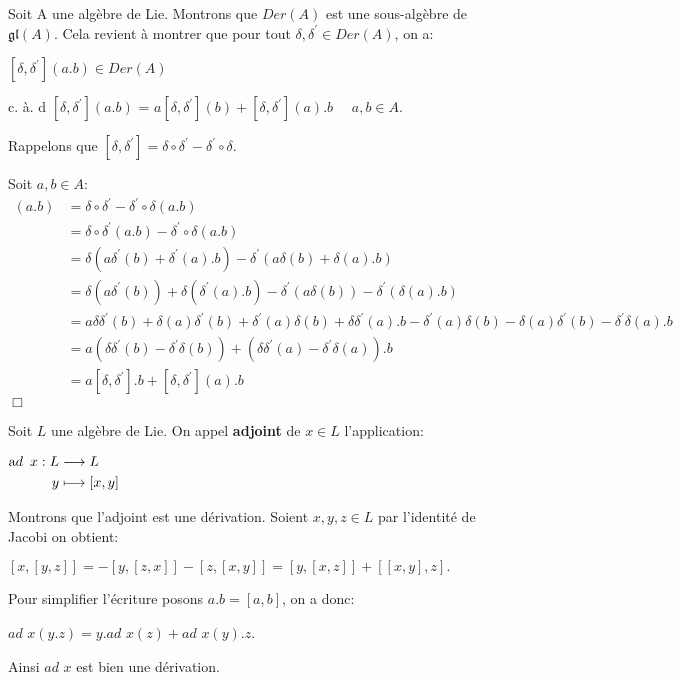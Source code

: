 \documentclass[a4paper,openany,12pt]{report}
\newcommand{\gl}{\mathfrak{gl}}
\theoremstyle{break}
{\theorembodyfont{\upshape}
\newtheorem*{rmq}{Remarque :}
\newtheorem*{prv}{Preuve :}
\newtheorem*{ex}{Exemples :}
\newtheorem*{exe}{Exemple : }
\newtheorem*{nota}{Notation :}
\newtheorem*{dem}{D\'emonstration :}}
\begin{document}
\begin{prv}
Soit A une algèbre de Lie. Montrons que $Der(A)$ est une sous-algèbre de $\gl(A)$. Cela revient à montrer que pour tout $\delta ,\delta^{\prime} \in Der(A)$, on a:
\begin{center}
$[\delta,\delta^{\prime}](a.b) \in Der(A)$
\end{center}
c. à. d $[\delta,\delta^{\prime}](a.b)$ = $a[\delta,\delta^{\prime}](b)+[\delta,\delta^{\prime}](a).b\quad$ $a,b\in A$.

Rappelons que $[\delta,\delta^{\prime}]=\delta\circ\delta^{\prime}-\delta^{\prime}\circ\delta$.

Soit $a,b\in A$:
\begin{align*}
[\delta,\delta^{\prime}](a.b) & = \delta\circ\delta^{\prime}-\delta^{\prime}\circ\delta(a.b) \\
& = \delta\circ\delta^{\prime}(a.b)-\delta^{\prime}\circ\delta(a.b)\\
& = \delta(a\delta^{\prime}(b)+\delta^{\prime}(a).b)-\delta^{\prime}(a\delta(b)+\delta(a).b)\\
& = \delta(a\delta^{\prime}(b))+\delta (\delta^{\prime}(a).b)-\delta^{\prime}(a\delta(b))-\delta^{\prime}(\delta(a).b)\\
& = a\delta\delta^{\prime}(b)+\delta(a)\delta^{\prime}(b)+\delta^{\prime}(a)\delta(b)+\delta\delta^{\prime}(a).b-\delta^{\prime}(a)\delta(b)-\delta(a)\delta^{\prime}(b)-\delta^{\prime}\delta(a).b \\
& = a(\delta\delta^{\prime}(b)-\delta^{\prime}\delta(b))+(\delta\delta^{\prime}(a)-\delta^{\prime}\delta(a)).b \\
& = a[\delta,\delta^{\prime}].b+[\delta,\delta^{\prime}](a).b\
\end{align*}
 $\Box$
\end{prv}

\begin{exe}
\quad Soit $L$ une algèbre de Lie. On appel \textbf{adjoint} de $x \in L$ l'application:
\begin{center}
$\begin{aligned} \text  ad \enskip x : L & \longrightarrow L \\ y & \longmapsto[x, y] \end{aligned}$
\end{center}

Montrons que l'adjoint est une dérivation. Soient $x,y,z \in L$ par l'identité de Jacobi on obtient:
\begin{center}
$[x,[y,z]]=-[y,[z,x]]-[z,[x,y]]=[y,[x,z]]+[[x,y],z].$
\end{center}
Pour simplifier l'écriture posons $a.b=[a,b]$, on a donc: 
\begin{center}
$ad$ $x(y.z)=y.ad$ $x(z)+ad$ $x(y).z$.
\end{center} 
Ainsi $ad$ $x$ est bien une dérivation.
\end{exe}
\end{document}
